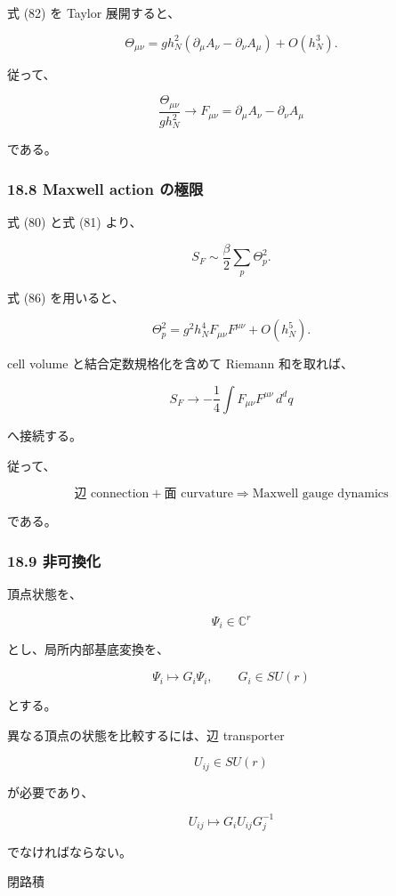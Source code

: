 \documentclass[
  a4paper,
]{ltjsarticle}
\begin{document}
式 (82) を Taylor 展開すると、

\[
\Theta_{\mu\nu}
=
gh_N^2
\left(
\partial_\mu A_\nu
-
\partial_\nu A_\mu
\right)
+
O(h_N^3).
\]

従って、

\[
\boxed{
\frac{\Theta_{\mu\nu}}{gh_N^2}
\longrightarrow
F_{\mu\nu}
=
\partial_\mu A_\nu
-
\partial_\nu A_\mu
}
\tag{86}
\]

である。

\subsubsection{18.8 Maxwell action
の極限}\label{maxwell-action-ux306eux6975ux9650}

式 (80) と式 (81) より、

\[
S_F
\sim
\frac{\beta}{2}
\sum_p
\Theta_p^2.
\]

式 (86) を用いると、

\[
\Theta_p^2
=
g^2h_N^4
F_{\mu\nu}F^{\mu\nu}
+
O(h_N^5).
\]

cell volume と結合定数規格化を含めて Riemann 和を取れば、

\[
\boxed{
S_F
\longrightarrow
-\frac14
\int
F_{\mu\nu}F^{\mu\nu}
\,d^dq
}
\tag{87}
\]

へ接続する。

従って、

\[
\boxed{
\text{辺 connection}
+
\text{面 curvature}
\Longrightarrow
\text{Maxwell gauge dynamics}
}
\tag{88}
\]

である。

\subsubsection{18.9 非可換化}\label{ux975eux53efux63dbux5316}

頂点状態を、

\[
\Psi_i\in\mathbb C^r
\]

とし、局所内部基底変換を、

\[
\Psi_i
\mapsto
G_i\Psi_i,
\qquad
G_i\in SU(r)
\tag{89}
\]

とする。

異なる頂点の状態を比較するには、辺 transporter

\[
U_{ij}\in SU(r)
\]

が必要であり、

\[
\boxed{
U_{ij}
\mapsto
G_iU_{ij}G_j^{-1}
}
\tag{90}
\]

でなければならない。

閉路積
\end{document}
